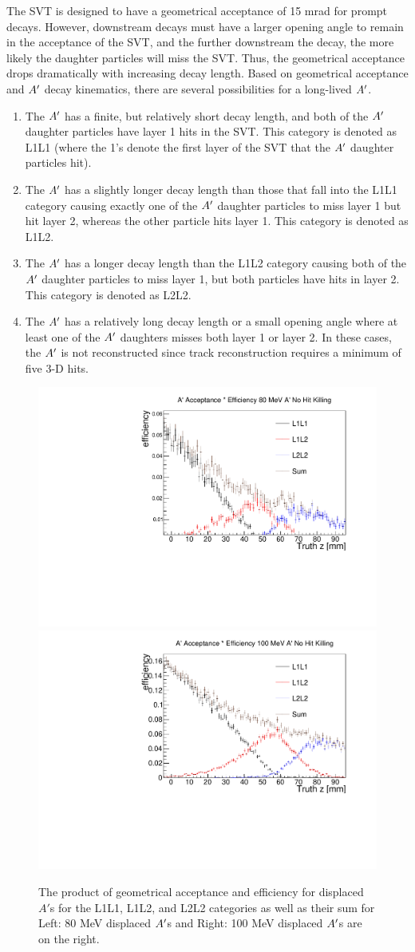 The SVT is designed to have a geometrical acceptance of 15 mrad for prompt decays. However, downstream decays must have a larger opening angle to remain in the acceptance of the SVT, and the further downstream the decay, the more likely the daughter particles will miss the SVT. Thus, the geometrical acceptance drops dramatically with increasing decay length. Based on geometrical acceptance and $A^\prime$ decay kinematics, there are several possibilities for a long-lived $A^\prime$.
\begin{enumerate}
  \item The $A^\prime$ has a finite, but relatively short decay length, and both of the $A^\prime$ daughter particles have layer 1 hits in the SVT. This category is denoted as L1L1 (where the 1's denote the first layer of the SVT that the $A^\prime$ daughter particles hit).
  \item The $A^\prime$ has a slightly longer decay length than those that fall into the L1L1 category causing exactly one of the $A^\prime$ daughter particles to miss layer 1 but hit layer 2, whereas the other particle hits layer 1. This category is denoted as L1L2.
  \item The $A^\prime$ has a longer decay length than the L1L2 category causing both of the $A^\prime$ daughter particles to miss layer 1, but both particles have hits in layer 2. This category is denoted as L2L2.
  \item The $A^\prime$ has a relatively long decay length or a small opening angle where at least one of the $A^\prime$ daughters misses both layer 1 or layer 2. In these cases, the $A^\prime$ is not reconstructed since track reconstruction requires a minimum of five 3-D hits.
\end{enumerate}

\begin{figure}[t]
    \centering
    \includegraphics[width=.45\textwidth]{figs/selection/ap_eff_80MeV_nohitkill.pdf}
    \includegraphics[width=.45\textwidth]{figs/selection/ap_eff_100MeV_nohitkill.pdf}
    \caption{The product of geometrical acceptance and efficiency for displaced $A'$s for the L1L1, L1L2, and L2L2 categories as well as their sum for Left: 80 MeV displaced $A^\prime$s and Right: 100 MeV displaced $A^\prime$s are on the right.}
    \label{fig:eff_nohitkill}
\end{figure}

